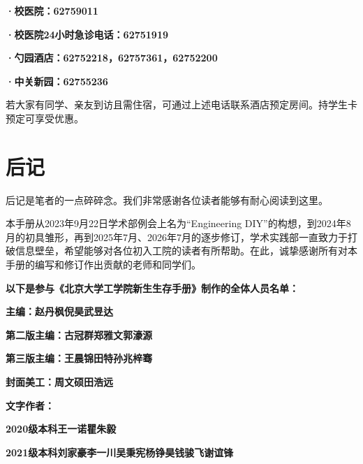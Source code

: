\documentclass[11pt,oneside]{book}
\begin{document}
\textbf{·校医院：62759011}

\textbf{·校医院24小时急诊电话：62751919}

\vspace{10pt}

\textbf{·勺园酒店：62752218，62757361，62752200}

\textbf{·中关新园：62755236}

若大家有同学、亲友到访且需住宿，可通过上述电话联系酒店预定房间。持学生卡预定可享受优惠。

\backmatter

\chapter*{后记}
后记是笔者的一点碎碎念。我们非常感谢各位读者能够有耐心阅读到这里。

\vspace{10pt}

本手册从2023年9月22日学术部例会上名为“Engineering DIY”的构想，到2024年8月的初具雏形，再到2025年7月、2026年7月的逐步修订，学术实践部一直致力于打破信息壁垒，希望能够对各位初入工院的读者有所帮助。在此，诚挚感谢所有对本手册的编写和修订作出贡献的老师和同学们。

\vspace{10pt}

\textbf{以下是参与《北京大学工学院新生生存手册》制作的全体人员名单：}

\textbf{主编：赵丹枫\hspace{6pt}倪\hspace{11pt}昊\hspace{6pt}武昱达}

\textbf{第二版主编：古冠群\hspace{6pt}郑雅文\hspace{6pt}郭濠源}

\textbf{第三版主编：王晨锦\hspace{6pt}田\hspace{11pt}特\hspace{6pt}孙兆梓骞}

\textbf{封面美工：周文硕\hspace{6pt}田浩远}

\textbf{文字作者：}

\textbf{2020级本科\hspace{20pt}王一诺\hspace{6pt}瞿朱毅}

\textbf{2021级本科\hspace{20pt}刘家豪\hspace{6pt}李一川\hspace{6pt}吴秉宪\hspace{6pt}杨铮昊\hspace{6pt}钱骏飞\hspace{6pt}谢谊锋}
\end{document}
